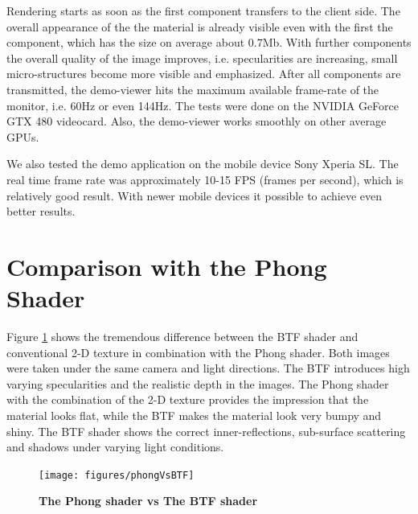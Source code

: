 Rendering starts as soon as the first component transfers to the client side.
 The overall appearance of the the material is already visible even with the first the component, which has the size on average about $0.7$Mb.
With further components the overall quality of the image improves, i.e. specularities are increasing, small micro-structures become more visible and emphasized.
After all components are transmitted, the demo-viewer hits the maximum available frame-rate of the monitor, i.e. 60Hz or even 144Hz.
The tests were done on the NVIDIA GeForce GTX 480 videocard. Also, the demo-viewer works smoothly on other average GPUs.

We also tested the demo application on the mobile device Sony Xperia SL.
The real time frame rate was approximately 10-15 FPS (frames per second), which is relatively good result.
With newer mobile devices it possible to achieve even better results.



\section{Comparison with the Phong Shader}
\label{section:eval_streaming}

Figure \ref{fig:phongvsbtf} shows the tremendous difference between the BTF shader and conventional 2-D texture in combination with the Phong shader.
Both images were taken under the same camera and light directions. The BTF introduces high varying specularities and the realistic depth in the images.
The Phong shader with the combination of the 2-D texture provides the impression that the material looks flat, while the BTF makes the material look very bumpy and shiny.
The BTF shader shows the correct inner-reflections, sub-surface scattering and shadows under varying light conditions.

\begin{figure}[h]
 \centering
 \texttt{[image: figures/phongVsBTF]}
 \caption[The Phong shader vs The BTF shader ] {
 	{\bf The Phong shader vs The BTF shader }
	}
 \label{fig:phongvsbtf}
\end{figure}

